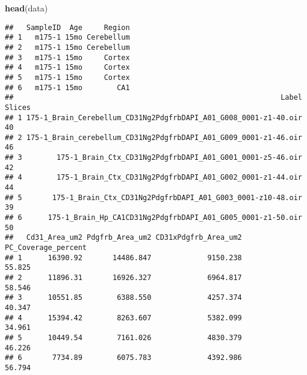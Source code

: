 \documentclass[
  a4paper,
  number-of-lines=30,
  textwidth=40zw]{bxjsarticle}
\newenvironment{Shaded}{\begin{snugshade}}{\end{snugshade}}
\newcommand{\AttributeTok}[1]{\textcolor[rgb]{0.13,0.29,0.53}{#1}}
\newcommand{\DecValTok}[1]{\textcolor[rgb]{0.00,0.00,0.81}{#1}}
\newcommand{\FunctionTok}[1]{\textcolor[rgb]{0.13,0.29,0.53}{\textbf{#1}}}
\newcommand{\NormalTok}[1]{#1}
\newcommand{\OtherTok}[1]{\textcolor[rgb]{0.56,0.35,0.01}{#1}}
\newcommand{\SpecialCharTok}[1]{\textcolor[rgb]{0.81,0.36,0.00}{\textbf{#1}}}
\newcommand{\StringTok}[1]{\textcolor[rgb]{0.31,0.60,0.02}{#1}}
\begin{document}
\begin{Shaded}
\end{Shaded}

\begin{Shaded}
\begin{Highlighting}[]
  \FunctionTok{head}\NormalTok{(data)}
\end{Highlighting}
\end{Shaded}

\begin{verbatim}
##   SampleID  Age     Region
## 1   m175-1 15mo Cerebellum
## 2   m175-1 15mo Cerebellum
## 3   m175-1 15mo     Cortex
## 4   m175-1 15mo     Cortex
## 5   m175-1 15mo     Cortex
## 6   m175-1 15mo        CA1
##                                                              Label Slices
## 1 175-1_Brain_Cerebellum_CD31Ng2PdgfrbDAPI_A01_G008_0001-z1-40.oir     40
## 2 175-1_Brain_cerebellum_CD31Ng2PdgfrbDAPI_A01_G009_0001-z1-46.oir     46
## 3        175-1_Brain_Ctx_CD31Ng2PdgfrbDAPI_A01_G001_0001-z5-46.oir     42
## 4        175-1_Brain_Ctx_CD31Ng2PdgfrbDAPI_A01_G002_0001-z1-44.oir     44
## 5       175-1_Brain_Ctx_CD31Ng2PdgfrbDAPI_A01_G003_0001-z10-48.oir     39
## 6      175-1_Brain_Hp_CA1CD31Ng2PdgfrbDAPI_A01_G005_0001-z1-50.oir     50
##   Cd31_Area_um2 Pdgfrb_Area_um2 CD31xPdgfrb_Area_um2 PC_Coverage_percent
## 1      16390.92       14486.847             9150.238              55.825
## 2      11896.31       16926.327             6964.817              58.546
## 3      10551.85        6388.550             4257.374              40.347
## 4      15394.42        8263.607             5382.099              34.961
## 5      10449.54        7161.026             4830.379              46.226
## 6       7734.89        6075.783             4392.986              56.794
\end{verbatim}
\end{document}
